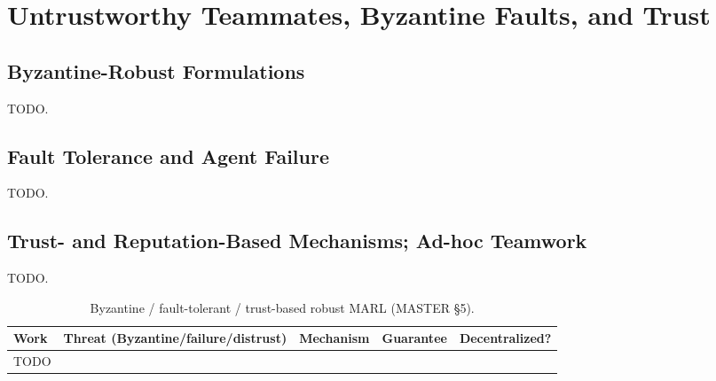 \section{Untrustworthy Teammates, Byzantine Faults, and Trust}
\label{sec:byzantine}

\subsection{Byzantine-Robust Formulations}
TODO.

\subsection{Fault Tolerance and Agent Failure}
TODO.

\subsection{Trust- and Reputation-Based Mechanisms; Ad-hoc Teamwork}
TODO.

\begin{table}[t]\centering\footnotesize
\caption{Byzantine / fault-tolerant / trust-based robust MARL (MASTER \S5).}
\label{tab:byzantine}
\begin{tabular}{lllll}
\toprule
Work & Threat (Byzantine/failure/distrust) & Mechanism & Guarantee & Decentralized? \\
\midrule
TODO & & & & \\
\bottomrule
\end{tabular}
\end{table}

